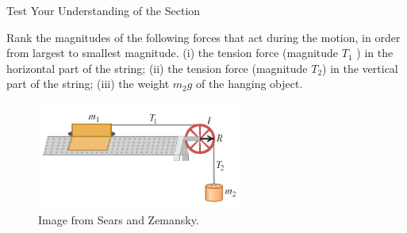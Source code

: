 \documentclass[]{beamer}
\begin{document}
\begin{frame}


  Test Your Understanding of the Section
  \vspace{7mm}

Rank the magnitudes of the following forces that act during the motion, in
  order from largest to smallest magnitude. (i) the tension force (magnitude $T_1$ ) in the horizontal
  part of the string; (ii) the tension force (magnitude $T_2$) in the vertical part of the
  string; (iii) the weight $m_2g$ of the hanging object.


  \begin{figure}[h!]  
    \includegraphics[width=0.6\textwidth]{images/8.jpg}
    \caption{Image from Sears and Zemansky. }
  \end{figure}



\end{frame}


















\end{document}
